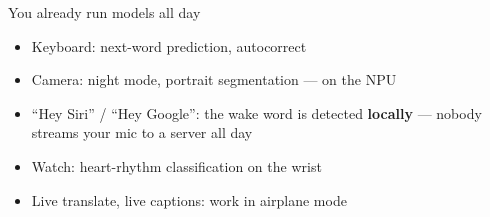 \begin{frame}{You already run models all day}
  \vspace{0.5em}
  \raggedright
  \begin{itemize}\itemsep5pt
    \item Keyboard: next-word prediction, autocorrect
    \item Camera: night mode, portrait segmentation --- on the NPU
    \item ``Hey Siri'' / ``Hey Google'': the wake word is detected
      \textbf{locally} --- nobody streams your mic to a server all day
    \item Watch: heart-rhythm classification on the wrist
    \item Live translate, live captions: work in airplane mode
  \end{itemize}

  \vspace{0.6em}
\end{frame}

